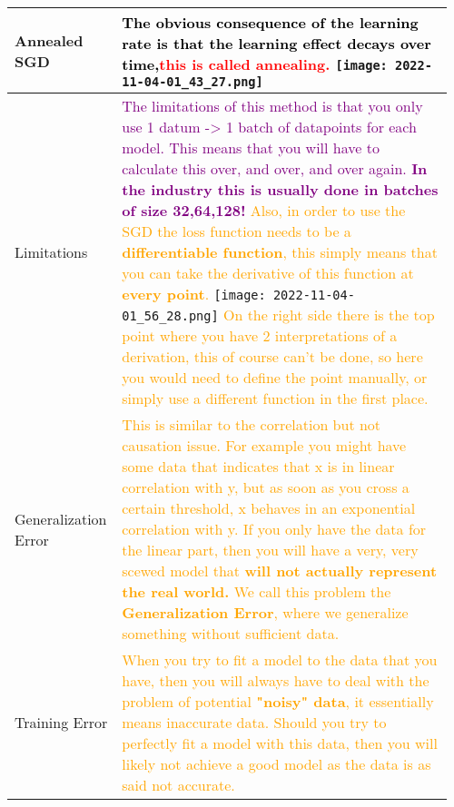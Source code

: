 \documentclass[main.tex,fontsize=8pt,paper=a4,paper=portrait,DIV=calc,]{scrartcl}
\begin{document}
\begin{table}[ht!]
\begin{tabular}{|m{0.2\linewidth}|m{0.755\linewidth}|}
\hline
Annealed SGD & 
\textcolor{black}{The obvious consequence of the \textbf{learning rate} is that \textbf{the learning effect decays over time,}}\textcolor{red}{this is called \textbf{annealing}.}\newline
\texttt{[image: 2022-11-04-01\_43\_27.png]}\\
\hline
Limitations & 
\textcolor{purple}{The limitations of this method is that you only use 1 datum -> 1 batch of datapoints for each model. This means that you will have to calculate this over, and over, and over again.\newline
\textbf{In the industry this is usually done in batches of size 32,64,128!}}\newline
\textcolor{orange}{Also, in order to use the SGD the loss function needs to be a \textbf{differentiable function}, this simply means that you can take the derivative of this function at \textbf{every point}. }\newline
\texttt{[image: 2022-11-04-01\_56\_28.png]}\newline
\textcolor{orange}{On the right side there is the top point where you have 2 interpretations of a derivation, this of course can't be done, so here you would need to define the point manually, or simply use a different function in the first place.}\\
\hline
Generalization Error & 
\textcolor{orange}{This is similar to the correlation but not causation issue. \newline
For example you might have some data that indicates that x is in linear correlation with y, but as soon as you cross a certain threshold, x behaves in an exponential correlation with y.\newline
If you only have the data for the linear part, then you will have a very, very scewed model that \textbf{will not actually represent the real world.}\newline
We call this problem the \textbf{Generalization Error}, where we generalize something without sufficient data.}\\
\hline
Training Error & 
\textcolor{orange}{When you try to fit a model to the data that you have, then you will always have to deal with the problem of potential \textbf{"noisy" data}, it essentially means inaccurate data.\newline
Should you try to perfectly fit a model with this data, then you will likely not achieve a good model as the data is as said not accurate.}\newline

\end{tabular}
\end{table}
\end{document}
